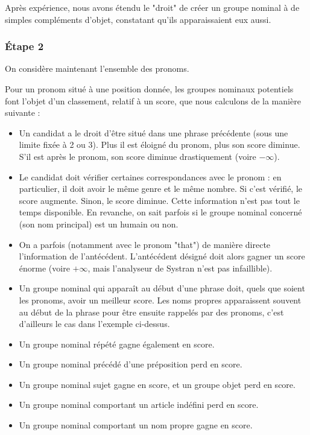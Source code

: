 \documentclass[a4paper, 12pt]{article}
\begin{document}
Après expérience, nous avons étendu le "droit" de créer un groupe nominal à de simples compléments d'objet, constatant qu'ils apparaissaient eux aussi.


\subsubsection{Étape 2}
On considère maintenant l'ensemble des pronoms.

Pour un pronom situé à une position donnée, les groupes nominaux potentiels font l'objet d'un classement, relatif à un score, que nous calculons de la manière suivante :

\begin{itemize}
 \item Un candidat a le droit d'être situé dans une phrase précédente (sous une limite fixée à 2 ou 3). Plus il est éloigné du pronom, plus son score diminue. S'il est après le pronom, son score diminue drastiquement (voire $-\infty$).
 \item Le candidat doit vérifier certaines correspondances avec le pronom : en particulier, il doit avoir le même genre et le même nombre. Si c'est vérifié, le score augmente. Sinon, le score diminue. Cette information n'est pas tout le temps disponible. En revanche, on sait parfois si le groupe nominal concerné (son nom principal) est un humain ou non.
 \item On a parfois (notamment avec le pronom "that") de manière directe l'information de l'antécédent. L'antécédent désigné doit alors gagner un score énorme (voire $+\infty$, mais l'analyseur de Systran n'est pas infaillible).
 \item Un groupe nominal qui apparaît au début d'une phrase doit, quels que soient les pronoms, avoir un meilleur score. Les noms propres apparaissent souvent au début de la phrase pour être ensuite rappelés par des pronoms, c'est d'ailleurs le cas dans l'exemple ci-dessus.
 \item Un groupe nominal répété gagne également en score.
 \item Un groupe nominal précédé d'une préposition perd en score.
 \item Un groupe nominal sujet gagne en score, et un groupe objet perd en score. 
 \item Un groupe nominal comportant un article indéfini perd en score.
 \item Un groupe nominal comportant un nom propre gagne en score.
\end{itemize}
\end{document}

